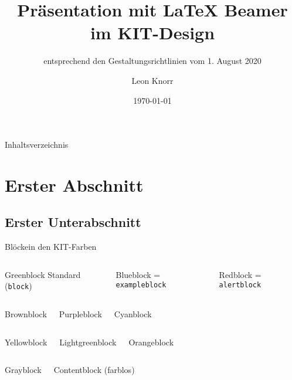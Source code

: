 \documentclass{sdqbeamer}
\title[KIT-Beamer-Vorlage]{Präsentation mit \LaTeX{} Beamer im KIT-Design}
\subtitle{entsprechend den Gestaltungsrichtlinien vom 1. August 2020}
\author[Leon Knorr]{Leon Knorr}
\date[\today]{\today}
\begin{document}
 
\KITtitleframe

\begin{frame}{Inhaltsverzeichnis}
\tableofcontents
\end{frame}

\section{Erster Abschnitt}

\subsection{Erster Unterabschnitt}
\begin{frame}{Blöcke}{in den KIT-Farben}
	\begin{columns}
		\begin{greenblock}{Greenblock}
			Standard (\texttt{block})
        \end{greenblock}
		\begin{blueblock}{Blueblock}
			= \texttt{exampleblock}
        \end{blueblock}
		\begin{redblock}{Redblock}
			= \texttt{alertblock}
        \end{redblock}
	\end{columns}
	\begin{columns}
		\column{.3\textwidth}
        \begin{brownblock}{Brownblock}
        \end{brownblock}
		\column{.3\textwidth}
        \begin{purpleblock}{Purpleblock}
        \end{purpleblock}
		\column{.3\textwidth}
        \begin{cyanblock}{Cyanblock}
        \end{cyanblock}
	\end{columns}
	\begin{columns}
        \begin{yellowblock}{Yellowblock}
        \end{yellowblock}
        \begin{lightgreenblock}{Lightgreenblock}
        \end{lightgreenblock}
        \begin{orangeblock}{Orangeblock}
        \end{orangeblock}
	\end{columns}
	\begin{columns}
		\column{.3\textwidth}
        \begin{grayblock}{Grayblock}
        \end{grayblock}
		\column{.3\textwidth}
		\begin{contentblock}{Contentblock}
			(farblos)
		\end{contentblock}
		\column{.3\textwidth}
	\end{columns}
\end{frame}
	  
\end{document}
